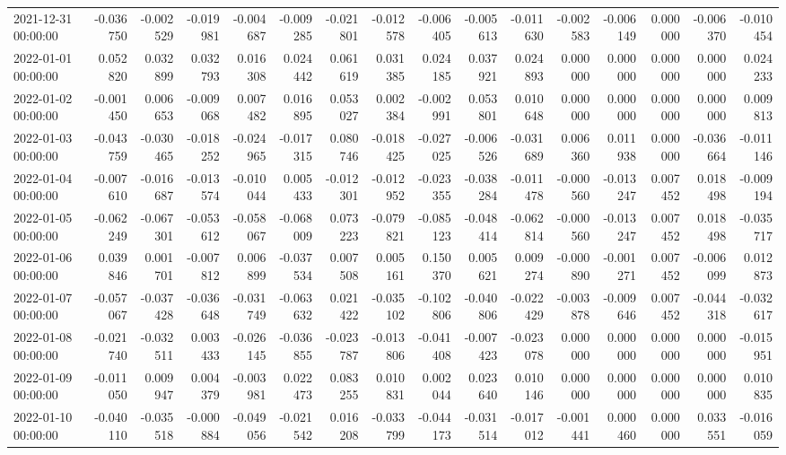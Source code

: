 \begin{tabular}{lrrrrrrrrrrrrrrr}
2021-12-31 00:00:00 & -0.036750 & -0.002529 & -0.019981 & -0.004687 & -0.009285 & -0.021801 & -0.012578 & -0.006405 & -0.005613 & -0.011630 & -0.002583 & -0.006149 & 0.000000 & -0.006370 & -0.010454 \\
2022-01-01 00:00:00 & 0.052820 & 0.032899 & 0.032793 & 0.016308 & 0.024442 & 0.061619 & 0.031385 & 0.024185 & 0.037921 & 0.024893 & 0.000000 & 0.000000 & 0.000000 & 0.000000 & 0.024233 \\
2022-01-02 00:00:00 & -0.001450 & 0.006653 & -0.009068 & 0.007482 & 0.016895 & 0.053027 & 0.002384 & -0.002991 & 0.053801 & 0.010648 & 0.000000 & 0.000000 & 0.000000 & 0.000000 & 0.009813 \\
2022-01-03 00:00:00 & -0.043759 & -0.030465 & -0.018252 & -0.024965 & -0.017315 & 0.080746 & -0.018425 & -0.027025 & -0.006526 & -0.031689 & 0.006360 & 0.011938 & 0.000000 & -0.036664 & -0.011146 \\
2022-01-04 00:00:00 & -0.007610 & -0.016687 & -0.013574 & -0.010044 & 0.005433 & -0.012301 & -0.012952 & -0.023355 & -0.038284 & -0.011478 & -0.000560 & -0.013247 & 0.007452 & 0.018498 & -0.009194 \\
2022-01-05 00:00:00 & -0.062249 & -0.067301 & -0.053612 & -0.058067 & -0.068009 & 0.073223 & -0.079821 & -0.085123 & -0.048414 & -0.062814 & -0.000560 & -0.013247 & 0.007452 & 0.018498 & -0.035717 \\
2022-01-06 00:00:00 & 0.039846 & 0.001701 & -0.007812 & 0.006899 & -0.037534 & 0.007508 & 0.005161 & 0.150370 & 0.005621 & 0.009274 & -0.000890 & -0.001271 & 0.007452 & -0.006099 & 0.012873 \\
2022-01-07 00:00:00 & -0.057067 & -0.037428 & -0.036648 & -0.031749 & -0.063632 & 0.021422 & -0.035102 & -0.102806 & -0.040806 & -0.022429 & -0.003878 & -0.009646 & 0.007452 & -0.044318 & -0.032617 \\
2022-01-08 00:00:00 & -0.021740 & -0.032511 & 0.003433 & -0.026145 & -0.036855 & -0.023787 & -0.013806 & -0.041408 & -0.007423 & -0.023078 & 0.000000 & 0.000000 & 0.000000 & 0.000000 & -0.015951 \\
2022-01-09 00:00:00 & -0.011050 & 0.009947 & 0.004379 & -0.003981 & 0.022473 & 0.083255 & 0.010831 & 0.002044 & 0.023640 & 0.010146 & 0.000000 & 0.000000 & 0.000000 & 0.000000 & 0.010835 \\
2022-01-10 00:00:00 & -0.040110 & -0.035518 & -0.000884 & -0.049056 & -0.021542 & 0.016208 & -0.033799 & -0.044173 & -0.031514 & -0.017012 & -0.001441 & 0.000460 & 0.000000 & 0.033551 & -0.016059 \\

\end{tabular}
